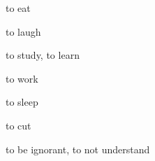 \begin{flashcard}{\LARGE to eat}
\LARGE {}
\end{flashcard}
\begin{flashcard}{\LARGE to laugh}
\LARGE {}
\end{flashcard}
\begin{flashcard}{\LARGE to study, to learn}
\LARGE {}
\end{flashcard}
\begin{flashcard}{\LARGE to work}
\LARGE {}
\end{flashcard}
\begin{flashcard}{\LARGE to sleep}
\LARGE {}
\end{flashcard}
\begin{flashcard}{\LARGE to cut}
\LARGE {}
\end{flashcard}
\begin{flashcard}{\LARGE to be ignorant, to not understand}
\LARGE {}
\end{flashcard}

